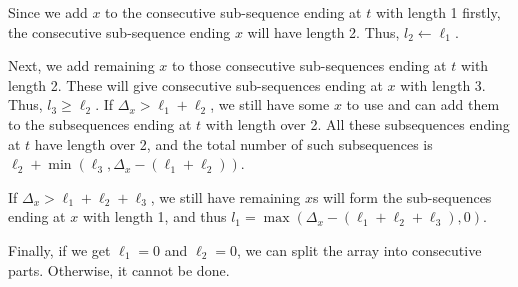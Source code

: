 Since we add $x$ to the consecutive sub-sequence ending at $t$ with length 1 firstly, the consecutive sub-sequence ending $x$ will have length 2. Thus, $l_2 \gets \ell_1$.

Next, we add remaining $x$ to those consecutive sub-sequences ending at $t$ with length 2. These will give consecutive sub-sequences ending at $x$ with length 3. Thus, $l_3\geq \ell_2$. If $\Delta_x > \ell_1 + \ell_2$, we still have some $x$ to use and can add them to the subsequences ending at $t$ with length over 2. All these subsequences ending at $t$ have length over 2, and the total number of such subsequences is $\ell_2 + \min(\ell_3, \Delta_x - (\ell_1 + \ell_2))$. 

If $\Delta_x > \ell_1 + \ell_2 + \ell_3$, we still have remaining $x$s will form the sub-sequences ending at $x$ with length 1, and thus $l_1 = \max(\Delta_x - (\ell_1 + \ell_2 + \ell_3), 0)$.

Finally, if we get $\ell_1=0$ and $\ell_2=0$, we can split the array into consecutive parts. Otherwise, it cannot be done.

